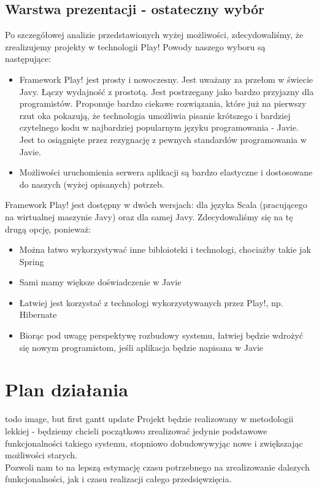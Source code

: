 \documentclass[a4paper,12pt,notitlepage]{mwrep}
\begin{document}
\subsection{Warstwa prezentacji - ostateczny wybór}
Po szczegółowej analizie przedstawionych wyżej możliwości, zdecydowaliśmy,
że zrealizujemy projekty w technologii Play! Powody naszego wyboru są następujące:
\begin{itemize}
	\item	Framework Play! jest prosty i nowoczesny. Jest uważany za przełom w świecie Javy.
			Łączy wydajność z prostotą. Jest postrzegany jako bardzo przyjazny dla programistów.
			Proponuje bardzo ciekawe rozwiązania, które już na pierwszy rzut oka pokazują,
			że technologia umożliwia pisanie krótszego i bardziej czytelnego kodu w najbardziej
			popularnym języku programowania - Javie. Jest to osiągnięte przez rezygnację
			z pewnych standardów programowania w Javie.
	\item	Możliwości uruchomienia serwera aplikacji są bardzo elastyczne i dostosowane
			do naszych (wyżej opisanych) potrzeb. 
\end{itemize}
Framework Play! jest dostępny w dwóch wersjach: dla języka Scala (pracującego na wirtualnej
maszynie Javy) oraz dla samej Javy. Zdecydowaliśmy się na tę drugą opcję, ponieważ:
\begin{itemize}
	\item	Można łatwo wykorzystywać inne bibloioteki i technologi, chociażby takie jak Spring
	\item	Sami mamy większe doświadczenie w Javie
	\item	Łatwiej jest korzystać z technologi wykorzystywanych przez Play!, np. Hibernate
	\item	Biorąc pod uwagę perspektywę rozbudowy systemu, łatwiej będzie wdrożyć się nowym programistom,
			jeśli aplikacja będzie napisana w Javie
\end{itemize}


\section{Plan działania}
todo image, but first gantt update
Projekt będzie realizowany w metodologii lekkiej - będziemy chcieli początkowo
zrealizować jedynie podstawowe funkcjonalności takiego systemu, stopniowo dobudowywyjąc
nowe i zwiększając możliwości starych.\\
Pozwoli nam to na lepszą estymację czasu potrzebnego na zrealizowanie dalszych funkcjonalności,
jak i czasu realizacji całego przedsięwzięcia.
\end{document}
